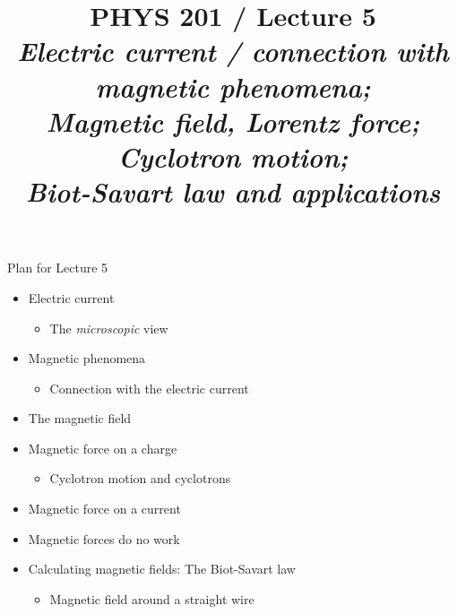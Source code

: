 \renewcommand{\prevlecture}{4 }
\renewcommand{\thislecture}{5 }
\renewcommand{\nextlecture}{6 }

%
%

\title[PHYS 201 / Lecture \thislecture]
{
  PHYS 201 / Lecture \thislecture\\
  {\it Electric current / connection with magnetic phenomena;\\
        Magnetic field, Lorentz force; Cyclotron motion;\\
        Biot-Savart law and applications}\\
}



\begin{frame}[plain]
  \titlepage
\end{frame}


%
%

\renewcommand{\lecturesummarytitle}{Revision }


%
%

\begin{frame}{Plan for Lecture \thislecture}

\begin{itemize}
   \item Electric current
      \begin{itemize}
           \item The {\em microscopic} view
      \end{itemize}
   \item Magnetic phenomena
      \begin{itemize}
           \item Connection with the electric current
      \end{itemize}
   \item The magnetic field
   \item Magnetic force on a charge
      \begin{itemize}
           \item Cyclotron motion and cyclotrons
      \end{itemize}
   \item Magnetic force on a current
   \item Magnetic forces do no work
   \item Calculating magnetic fields: The Biot-Savart law
     \begin{itemize}
           \item Magnetic field around a straight wire
      \end{itemize}
\end{itemize}

\end{frame}

